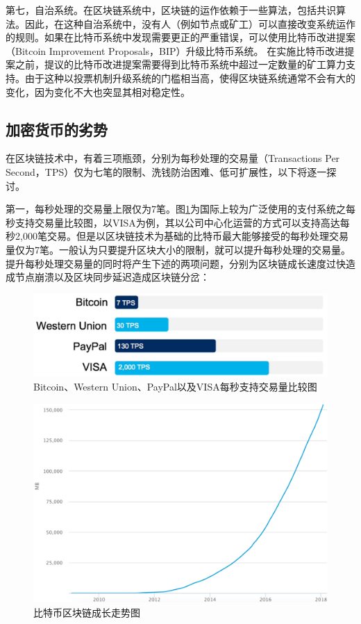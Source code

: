 				第七，自治系统。在区块链系统中，区块链的运作依赖于一些算法，包括共识算法。因此，在这种自治系统中，没有人（例如节点或矿工）可以直接改变系统运作的规则。如果在比特币系统中发现需要更正的严重错误，可以使用比特币改进提案（Bitcoin Improvement Proposals，BIP）\supercite{BitcoinImprovementProposals}升级比特币系统。 在实施比特币改进提案之前，提议的比特币改进提案需要得到比特币系统中超过一定数量的矿工算力支持。由于这种以投票机制升级系统的门槛相当高，使得区块链系统通常不会有大的变化，因为变化不⼤也突显其相对稳定性。

			\subsection{加密货币的劣势}
			在区块链技术中，有着三项瓶颈，分别为每秒处理的交易量（Transactions Per Second，TPS）仅为七笔的限制、洗钱防治困难、低可扩展性，以下将逐一探讨。

				第一，每秒处理的交易量上限仅为7笔。图\ref{TPS}为国际上较为广泛使用的⽀付系统之每秒⽀持交易量⽐较图，以VISA为例，其以公司中心化运营的方式可以支持高达每秒2,000笔交易。但是以区块链技术为基础的比特币最大能够接受的每秒处理交易量仅为7笔。一般认为只要提升区块大小的限制，就可以提升每秒处理的交易量。提升每秒处理交易量的同时将产生下述的两项问题，分别为区块链成长速度过快造成节点崩溃以及区块同步延迟造成区块链分岔：

					\begin{figure}[!htbp]
						\centering
						\includegraphics[width = .6\textwidth]{TPS.png}
						\caption{Bitcoin、Western Union\supercite{WesternUnion}、PayPal\supercite{PayPal}以及VISA每秒支持交易量比较图\supercite{digibyte}}\label{TPS}
					\end{figure}

					\begin{figure}[!htbp]
						\centering
						\includegraphics[width = .8\textwidth]{blockchainsize.png}
						\caption{比特币区块链成长走势图\supercite{blockchainsize}}\label{blockchainsize}
					\end{figure}


